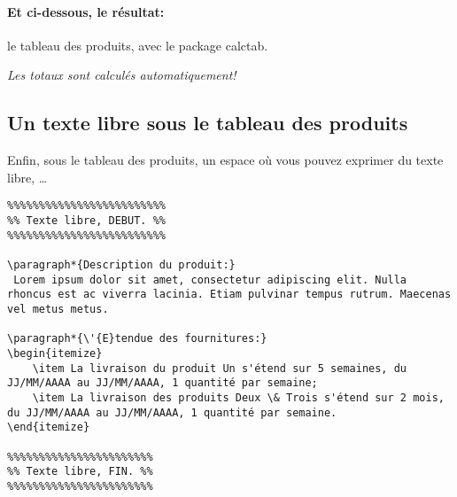 \documentclass[a4paper,10pt]{article}
\begin{document}
\paragraph{Et ci-dessous, le résultat:} le tableau des produits, avec le package calctab.

\emph{Les totaux sont calculés automatiquement!}

\ctcurrency{\euro}


\begin{xcalctab}
\normalfont
{}



\end{xcalctab}


\subsection{Un texte libre sous le tableau des produits}

Enfin, sous le tableau des produits, un espace où vous pouvez exprimer du texte libre, \ldots

\begin{lstlisting}
%%%%%%%%%%%%%%%%%%%%%%%%%
%% Texte libre, DEBUT. %%
%%%%%%%%%%%%%%%%%%%%%%%%%

\paragraph*{Description du produit:}
 Lorem ipsum dolor sit amet, consectetur adipiscing elit. Nulla rhoncus est ac viverra lacinia. Etiam pulvinar tempus rutrum. Maecenas vel metus metus. 

\paragraph*{\'{E}tendue des fournitures:}
\begin{itemize}
    \item La livraison du produit Un s'étend sur 5 semaines, du JJ/MM/AAAA au JJ/MM/AAAA, 1 quantité par semaine;
    \item La livraison des produits Deux \& Trois s'étend sur 2 mois, du JJ/MM/AAAA au JJ/MM/AAAA, 1 quantité par semaine.
\end{itemize}

%%%%%%%%%%%%%%%%%%%%%%%
%% Texte libre, FIN. %%
%%%%%%%%%%%%%%%%%%%%%%%
\end{lstlisting}
\end{document}

